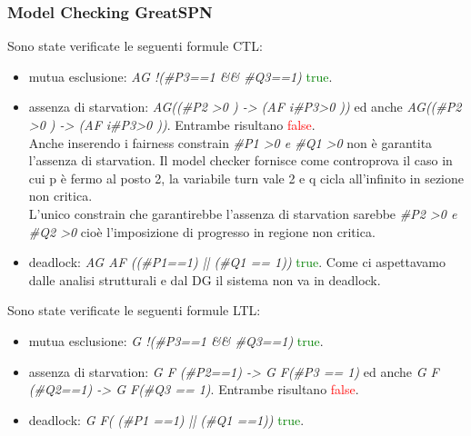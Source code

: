 \documentclass[a4paper]{article}
\begin{document}
\subsubsection{Model Checking GreatSPN}
Sono state verificate le seguenti formule CTL:
\begin{itemize}
	\item mutua esclusione: \textit{AG !(\#P3==1 \&\& \#Q3==1)} \textcolor{green}{true}.
	\item assenza di starvation: \textit{AG((\#P2 >0 ) -> (AF i\#P3>0 ))} ed anche \textit{AG((\#P2 >0 ) -> (AF i\#P3>0 ))}. Entrambe risultano \textcolor{red}{false}.\\
		Anche inserendo i fairness constrain \textit{\#P1 >0 \textit{e} \#Q1 >0} non è garantita l'assenza di starvation. Il model checker fornisce come controprova il caso in cui p è fermo al posto 2, la variabile turn vale 2 e q cicla all'infinito in sezione non critica.\\
		L'unico constrain che garantirebbe l'assenza di starvation sarebbe \textit{\#P2 >0 \textit{e} \#Q2 >0} cioè l'imposizione di progresso in regione non critica.
	\item deadlock: \textit{AG AF ((\#P1==1) || (\#Q1 == 1))} \textcolor{green}{true}. Come ci aspettavamo dalle analisi strutturali e dal DG il sistema non va in deadlock.
\end{itemize}
Sono state verificate le seguenti formule LTL:
\begin{itemize}
	\item mutua esclusione: \textit{G !(\#P3==1 \&\& \#Q3==1)} \textcolor{green}{true}.
	\item assenza di starvation: \textit{G F (\#P2==1) -> G F(\#P3 == 1)} ed anche \textit{G F (\#Q2==1) -> G F(\#Q3 == 1)}. Entrambe risultano \textcolor{red}{false}.\\
	\item deadlock: \textit{G F( (\#P1 ==1) ||  (\#Q1 ==1))} \textcolor{green}{true}.
\end{itemize}
\end{document}
